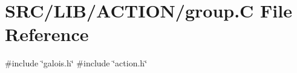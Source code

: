 \hypertarget{group_8_c}{}\section{S\+R\+C/\+L\+I\+B/\+A\+C\+T\+I\+O\+N/group.C File Reference}
\label{group_8_c}
{\ttfamily \#include \char`\"{}galois.\+h\char`\"{}}\newline
{\ttfamily \#include \char`\"{}action.\+h\char`\"{}}\newline
